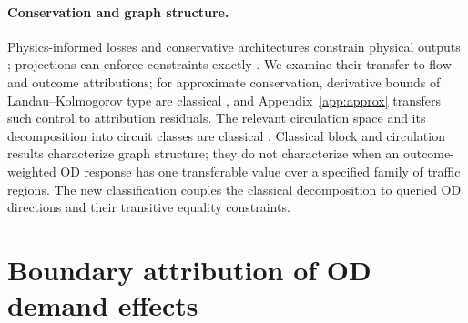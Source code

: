 \documentclass[a4paper,fleqn]{cas-sc}
\begin{document}
\paragraph{Conservation and graph structure.}
Physics-informed losses and conservative architectures constrain physical
outputs \citep{raissi2019physics,shi2021physics,richterpowell2022neural};
projections can enforce constraints exactly \citep{valente2025physics,baez2024guaranteeing}.
We examine their transfer to flow and outcome attributions; for
approximate conservation, derivative bounds of Landau--Kolmogorov type
are classical \citep{shadrin2014landau}, and
Appendix~\ref{app:approx} transfers such control to attribution
residuals. The relevant
circulation space and its decomposition into circuit classes are classical
\citep{oxley2011matroid,hopcroft1973algorithm}. Classical block and
circulation results characterize graph structure; they do not
characterize when an outcome-weighted OD response has one transferable
value over a specified family of traffic regions. The new
classification couples the classical decomposition to queried OD
directions and their transitive equality constraints.

\section{Boundary attribution of OD demand effects}\label{sec:objects}
\end{document}

